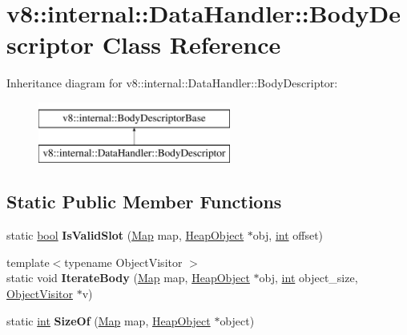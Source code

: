 \hypertarget{classv8_1_1internal_1_1DataHandler_1_1BodyDescriptor}{}\section{v8\+:\+:internal\+:\+:Data\+Handler\+:\+:Body\+Descriptor Class Reference}
\label{classv8_1_1internal_1_1DataHandler_1_1BodyDescriptor}
Inheritance diagram for v8\+:\+:internal\+:\+:Data\+Handler\+:\+:Body\+Descriptor\+:\begin{figure}[H]
\begin{center}
\leavevmode
\includegraphics[height=2.000000cm]{classv8_1_1internal_1_1DataHandler_1_1BodyDescriptor}
\end{center}
\end{figure}
\subsection*{Static Public Member Functions}
\begin{DoxyCompactItemize}
\item 
\mbox{\label{classv8_1_1internal_1_1DataHandler_1_1BodyDescriptor_a81233d485d186bb3a20f1616f0cb0c87}} 
static \mbox{\hyperlink{classbool}{bool}} {\bfseries Is\+Valid\+Slot} (\mbox{\hyperlink{classv8_1_1internal_1_1Map}{Map}} map, \mbox{\hyperlink{classv8_1_1internal_1_1HeapObject}{Heap\+Object}} $\ast$obj, \mbox{\hyperlink{classint}{int}} offset)
\item 
\mbox{\label{classv8_1_1internal_1_1DataHandler_1_1BodyDescriptor_aaf553d9928a39c7e928515f978616e62}} 
{\footnotesize template$<$typename Object\+Visitor $>$ }\\static void {\bfseries Iterate\+Body} (\mbox{\hyperlink{classv8_1_1internal_1_1Map}{Map}} map, \mbox{\hyperlink{classv8_1_1internal_1_1HeapObject}{Heap\+Object}} $\ast$obj, \mbox{\hyperlink{classint}{int}} object\+\_\+size, \mbox{\hyperlink{classv8_1_1internal_1_1ObjectVisitor}{Object\+Visitor}} $\ast$v)
\item 
\mbox{\label{classv8_1_1internal_1_1DataHandler_1_1BodyDescriptor_a9bb3323ced2df4019a33bdebec520477}} 
static \mbox{\hyperlink{classint}{int}} {\bfseries Size\+Of} (\mbox{\hyperlink{classv8_1_1internal_1_1Map}{Map}} map, \mbox{\hyperlink{classv8_1_1internal_1_1HeapObject}{Heap\+Object}} $\ast$object)
\end{DoxyCompactItemize}
